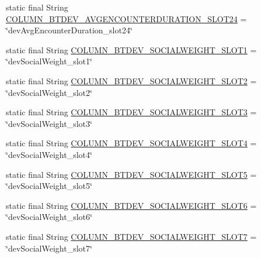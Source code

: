\begin{DoxyCompactItemize}
\item 
static final String \hyperlink{classcs_1_1nsense_1_1db_1_1_n_sense_s_q_lite_helper_a1658e2b1ff310225d5a5ffc818a9809f}{C\-O\-L\-U\-M\-N\-\_\-\-B\-T\-D\-E\-V\-\_\-\-A\-V\-G\-E\-N\-C\-O\-U\-N\-T\-E\-R\-D\-U\-R\-A\-T\-I\-O\-N\-\_\-\-S\-L\-O\-T24} = \char`\"{}dev\-Avg\-Encounter\-Duration\-\_\-slot24\char`\"{}
\item 
static final String \hyperlink{classcs_1_1nsense_1_1db_1_1_n_sense_s_q_lite_helper_a2d1874e05b0dcb1f6628c54ed0b027af}{C\-O\-L\-U\-M\-N\-\_\-\-B\-T\-D\-E\-V\-\_\-\-S\-O\-C\-I\-A\-L\-W\-E\-I\-G\-H\-T\-\_\-\-S\-L\-O\-T1} = \char`\"{}dev\-Social\-Weight\-\_\-slot1\char`\"{}
\item 
static final String \hyperlink{classcs_1_1nsense_1_1db_1_1_n_sense_s_q_lite_helper_aa8f004540621f676c6776de2c9f44b37}{C\-O\-L\-U\-M\-N\-\_\-\-B\-T\-D\-E\-V\-\_\-\-S\-O\-C\-I\-A\-L\-W\-E\-I\-G\-H\-T\-\_\-\-S\-L\-O\-T2} = \char`\"{}dev\-Social\-Weight\-\_\-slot2\char`\"{}
\item 
static final String \hyperlink{classcs_1_1nsense_1_1db_1_1_n_sense_s_q_lite_helper_a4015db276ba22912d70ece5b54c81b43}{C\-O\-L\-U\-M\-N\-\_\-\-B\-T\-D\-E\-V\-\_\-\-S\-O\-C\-I\-A\-L\-W\-E\-I\-G\-H\-T\-\_\-\-S\-L\-O\-T3} = \char`\"{}dev\-Social\-Weight\-\_\-slot3\char`\"{}
\item 
static final String \hyperlink{classcs_1_1nsense_1_1db_1_1_n_sense_s_q_lite_helper_a0e353ae98c5e536373cea2af063fc1be}{C\-O\-L\-U\-M\-N\-\_\-\-B\-T\-D\-E\-V\-\_\-\-S\-O\-C\-I\-A\-L\-W\-E\-I\-G\-H\-T\-\_\-\-S\-L\-O\-T4} = \char`\"{}dev\-Social\-Weight\-\_\-slot4\char`\"{}
\item 
static final String \hyperlink{classcs_1_1nsense_1_1db_1_1_n_sense_s_q_lite_helper_a7dbad974bb6a01f5f64b4da61408bec5}{C\-O\-L\-U\-M\-N\-\_\-\-B\-T\-D\-E\-V\-\_\-\-S\-O\-C\-I\-A\-L\-W\-E\-I\-G\-H\-T\-\_\-\-S\-L\-O\-T5} = \char`\"{}dev\-Social\-Weight\-\_\-slot5\char`\"{}
\item 
static final String \hyperlink{classcs_1_1nsense_1_1db_1_1_n_sense_s_q_lite_helper_a892b29c63543d2510b4f543ede759c53}{C\-O\-L\-U\-M\-N\-\_\-\-B\-T\-D\-E\-V\-\_\-\-S\-O\-C\-I\-A\-L\-W\-E\-I\-G\-H\-T\-\_\-\-S\-L\-O\-T6} = \char`\"{}dev\-Social\-Weight\-\_\-slot6\char`\"{}
\item 
static final String \hyperlink{classcs_1_1nsense_1_1db_1_1_n_sense_s_q_lite_helper_aff13368b80bfd063e70429ef497c4799}{C\-O\-L\-U\-M\-N\-\_\-\-B\-T\-D\-E\-V\-\_\-\-S\-O\-C\-I\-A\-L\-W\-E\-I\-G\-H\-T\-\_\-\-S\-L\-O\-T7} = \char`\"{}dev\-Social\-Weight\-\_\-slot7\char`\"{}
\item 

\end{DoxyCompactItemize}
